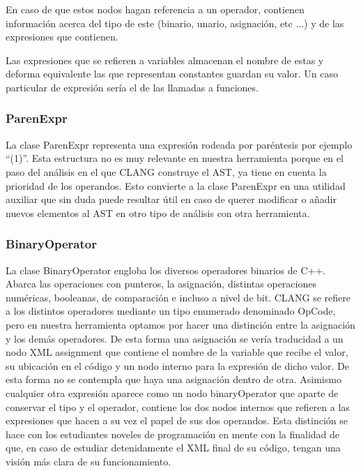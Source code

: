 En caso de que estos nodos hagan referencia a un operador, contienen informaci\'on acerca del tipo de este (binario, unario, asignaci\'on, etc ...) y de las expresiones que contienen.

Las expresiones que se refieren a variables almacenan el nombre de estas y deforma equivalente las que representan constantes guardan su valor. Un caso particular de expresi\'on ser\'ia el de las llamadas a funciones.

\subsubsection*{ParenExpr}

La clase ParenExpr representa una expresi\'on rodeada por par\'entesis por ejemplo ``(1)''. Esta estructura no es muy relevante en nuestra herramienta porque en el paso del an\'alisis en el que CLANG construye el AST, ya tiene en cuenta la prioridad de los operandos. Esto convierte a la clase ParenExpr en una utilidad auxiliar que sin duda puede resultar \'util en caso de querer modificar o a\~nadir nuevos elementos al AST en otro tipo de an\'alisis con otra herramienta.

\subsubsection*{BinaryOperator}

La clase BinaryOperator engloba los diversos operadores binarios de C++. Abarca las operaciones con punteros, la asignaci\'on, distintas operaciones num\'ericas, booleanas, de comparaci\'on e incluso a nivel de bit. CLANG se refiere a los distintos operadores mediante un tipo enumerado denominado OpCode, pero en nuestra herramienta optamos por hacer una distinci\'on entre la asignaci\'on y los dem\'as operadores. De esta forma una asignaci\'on se ver\'ia traducidad a un nodo XML assignment que contiene el nombre de la variable que recibe el valor, su ubicaci\'on en el c\'odigo y un nodo interno para la expresi\'on de dicho valor. De esta forma no se contempla que haya una asignaci\'on dentro de otra. Asimismo cualquier otra expresi\'on aparece como un nodo binaryOperator que aparte de conservar el tipo y el operador, contiene los dos nodos internos que refieren a las expresiones que hacen a su vez el papel de sus dos operandos. Esta distinci\'on se hace con los estudiantes noveles de programaci\'on en mente con la finalidad de que, en caso de estudiar detenidamente el XML final de su c\'odigo, tengan una visi\'on m\'as clara de su funcionamiento.

